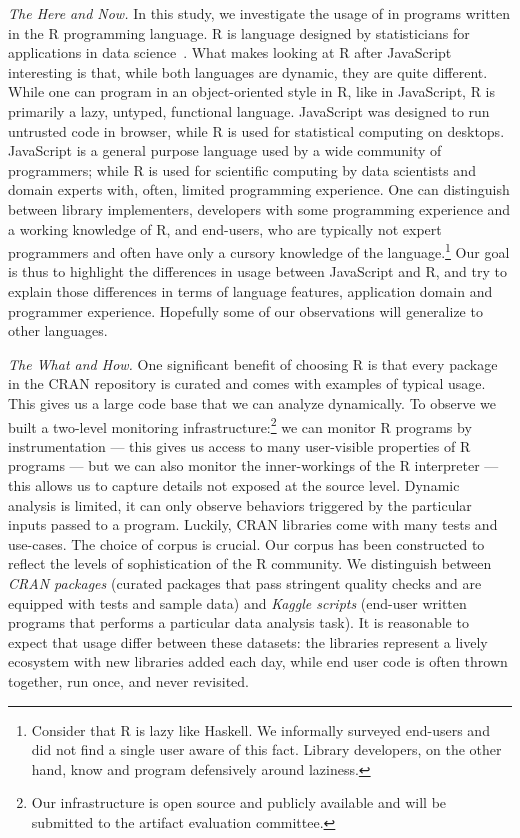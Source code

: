 \documentclass[review,nonacm,screen,acmsmall,anonymous=true]{acmart}
\begin{document}
\vspace{2mm}\noindent\emph{The Here and Now.} In this study, we investigate the
usage of \eval in programs written in the R programming language. R is language
designed by statisticians for applications in data science~\cite{r,R96}. What
makes looking at R after JavaScript interesting is that, while both languages
are dynamic, they are quite different. While one can program in an
object-oriented style in R, like in JavaScript, R is primarily a lazy, untyped,
functional language. JavaScript was designed to run untrusted code in browser,
while R is used for statistical computing on desktops. JavaScript is a general
purpose language used by a wide community of programmers; while R is used for
scientific computing by data scientists and domain experts with, often, limited
programming experience. One can distinguish between library implementers,
developers with some programming experience and a working knowledge of R, and
end-users, who are typically not expert programmers and often have only a
cursory knowledge of the language.\footnote{Consider that R is lazy like
Haskell. We informally surveyed end-users and did not find a single user aware
of this fact. Library developers, on the other hand, know and program
defensively around laziness.} Our goal is thus to highlight the differences in
usage between JavaScript and R, and try to explain those differences in terms of
language features, application domain and programmer experience. Hopefully some
of our observations will generalize to other languages.

\vspace{2mm}\noindent\emph{The What and How.} One significant benefit of
choosing R is that every package in the CRAN repository is curated and comes
with examples of typical usage. This gives us a large code base that we can
analyze dynamically. To observe \eval we built a two-level monitoring
infrastructure:\footnote{Our infrastructure is open source and publicly
available and  will be submitted to the artifact evaluation committee. } we can
monitor R programs by instrumentation --- this gives us access to many
user-visible properties of R programs --- but we can also monitor the
inner-workings of the R interpreter --- this allows us to capture details not
exposed at the source level. Dynamic analysis is limited, it can only observe
behaviors triggered by the particular inputs passed to a program. Luckily, CRAN
libraries come with many tests and use-cases. The choice of corpus is crucial.
Our corpus has been constructed to reflect the levels of sophistication of the R
community. We distinguish between \emph{CRAN packages} (\CranPackages curated
packages that pass stringent quality checks and are equipped with tests and
sample data) and \emph{Kaggle scripts} (\KaggleUnique end-user written programs
that performs a particular data analysis task). It is reasonable to expect that
\eval usage differ between these datasets: the libraries represent a lively
ecosystem with new libraries added each day, while end user code is often thrown
together, run once, and never revisited.
\end{document}
